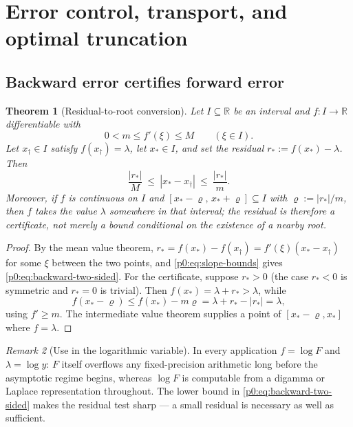 \documentclass[11pt,a4paper,oneside]{book}
\theoremstyle{plain}
\newtheorem{theorem}{Theorem}[chapter]
\theoremstyle{definition}
\theoremstyle{remark}
\newtheorem{remark}[theorem]{Remark}
\newcommand{\Real}{\mathbb{R}}
\begin{document}
\section{Error control, transport, and optimal truncation}
\label{p0:sec:errors}

\subsection{Backward error certifies forward error}

\begin{theorem}[Residual-to-root conversion]\label{p0:thm:backward-error}
Let $I\subseteq\Real$ be an interval and $f:I\to\Real$ differentiable with
\begin{equation}\label{p0:eq:slope-bounds}
 0<m\le f'(\xi)\le M\qquad(\xi\in I).
\end{equation}
Let $x_\dagger\in I$ satisfy $f(x_\dagger)=\lambda$, let $x_\ast\in I$, and set
the \emph{residual} $r_\ast:=f(x_\ast)-\lambda$.  Then
\begin{equation}\label{p0:eq:backward-two-sided}
 \frac{|r_\ast|}{M}\ \le\ |x_\ast-x_\dagger|\ \le\ \frac{|r_\ast|}{m} .
\end{equation}
Moreover, if $f$ is continuous on $I$ and
$[x_\ast-\varrho,\,x_\ast+\varrho]\subseteq I$ with $\varrho:=|r_\ast|/m$,
then $f$ takes the value $\lambda$ somewhere in that interval; the residual is
therefore a \emph{certificate}, not merely a bound conditional on the
existence of a nearby root.
\end{theorem}

\begin{proof}
By the mean value theorem, $r_\ast=f(x_\ast)-f(x_\dagger)=f'(\xi)(x_\ast-x_\dagger)$
for some $\xi$ between the two points, and \eqref{p0:eq:slope-bounds} gives
\eqref{p0:eq:backward-two-sided}.  For the certificate, suppose $r_\ast>0$
(the case $r_\ast<0$ is symmetric and $r_\ast=0$ is trivial).  Then
$f(x_\ast)=\lambda+r_\ast>\lambda$, while
\[
 f(x_\ast-\varrho)\le f(x_\ast)-m\varrho=\lambda+r_\ast-|r_\ast|=\lambda,
\]
using $f'\ge m$.  The intermediate value theorem supplies a point of
$[x_\ast-\varrho,x_\ast]$ where $f=\lambda$.
\end{proof}

\begin{remark}[Use in the logarithmic variable]\label{p0:rem:log-residual}
In every application $f=\log F$ and $\lambda=\log y$: $F$ itself overflows any
fixed-precision arithmetic long before the asymptotic regime begins, whereas
$\log F$ is computable from a digamma or Laplace representation throughout.
The lower bound in \eqref{p0:eq:backward-two-sided} makes the residual test
sharp --- a small residual is necessary as well as sufficient.
\end{remark}
\end{document}
